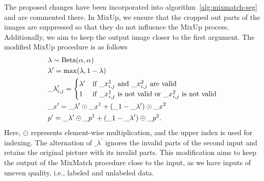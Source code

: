 The proposed changes have been incorporated into algorithm~\ref{alg:mixmatch-seg} and are commented there. In MixUp, we 
ensure that the cropped out parts of the images are suppressed so that they do not influence the MixUp process. 
Additionally, we aim to keep the output image closer to the first argument. The modified MixUp procedure is as follows
\begin{align}
  &\lambda \sim \text{Beta}(\alpha,\alpha) \notag\\
  &\lambda^\prime = \max(\lambda,1-\lambda) \notag\\
  &\_\lambda^\prime_{i,j} =\begin{cases}
    \lambda^\prime & \text{if } \_x^{1}_{i,j} \text{ and }  \_x^{2}_{i,j} \text{ are valid}\\
    1 & \text{if }  \_x^{1}_{i,j} \text{ is not valid or }  \_x^{2}_{i,j} \text{ is not valid}\\
  \end{cases} \label{eq:mixup_alternated}\\
  &\_x^\prime = \_\lambda^\prime \odot \_x^1 + (\_1-\_\lambda^\prime) \odot \_x^2 \notag\\
  &p^\prime = \_\lambda^\prime \odot \_p^1 + (\_1-\_\lambda^\prime) \odot \_p^2. \notag
\end{align}
Here, $\odot$ represents element-wise multiplication, and the upper index is used for indexing. The alternation
 of $\_{\lambda}^\prime$ ignores the invalid parts of the second input and retains the original picture 
 with its invalid parts. This modification aims to keep the output of the MixMatch procedure close to the input, as 
 we have inputs of uneven quality, i.e., labeled and unlabeled data.

